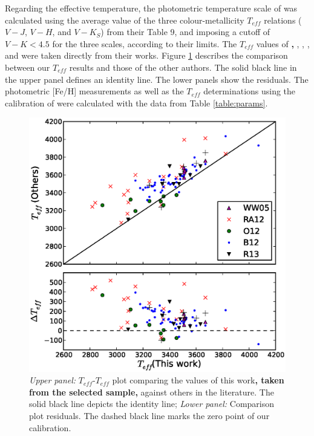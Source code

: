 \documentclass[referee]{aa}
\begin{document}
Regarding the effective temperature, the photometric temperature scale of \citet{Boyajian-2012} was calculated using the average value of the three colour-metallicity $T_{eff}$ relations ($V-J$, $V-H$, and $V-K_{S}$) from their Table 9, and imposing a cutoff of $V-K < 4.5$ for the three scales, according to their limits.  %
The $T_{eff}$ values of \textbf{\citet{Woolf-2005},} \citet{Rojas-Ayala-2012}, \citet{Onehag-2012}, \citet{Mann-2013a}, and \citet{Rajpurohit-2013a} were taken directly from their works. Figure \ref{fig:compteff} describes the comparison between our $T_{eff}$ results and those of the other authors. The solid black line in the upper panel defines an identity line. The lower panels show the residuals. %
The photometric [Fe/H] measurements as well as the $T_{eff}$ determinations using the calibration of \citet{Boyajian-2012} were calculated with the data from Table \ref{table:params}.

\begin{figure}[]
\begin{center}
\includegraphics[scale=0.5]{pics/compteffv3.eps}
\end{center}
\caption{\textit{Upper panel:} $T_{eff}$-$T_{eff}$ plot comparing the values of this work\textbf{, taken from the selected sample,} against others in the literature. The solid black line depicts the identity line; \textit{Lower panel:} Comparison plot residuals. The dashed black line marks the zero point of our calibration.}
\label{fig:compteff}
\end{figure}
\end{document}
